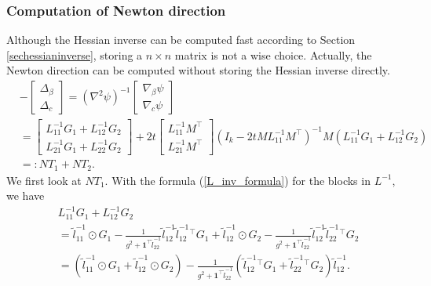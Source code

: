 \documentclass[final,onefignum,onetabnum]{siamart190516}
\begin{document}
\subsubsection{Computation of Newton direction}
Although the Hessian inverse can be computed fast according to Section \ref{sechessianinverse}, storing a $n\times n$ matrix is not a wise choice. Actually, the Newton direction can be computed without storing the Hessian inverse directly.
\begin{equation}
    \begin{aligned}
   &- \begin{bmatrix}
    \Delta_{\beta}\\
    \Delta_c
    \end{bmatrix} = \left(\nabla^{2}\psi\right)^{-1} \begin{bmatrix}
    \nabla_{\beta}\psi\\
    \nabla_{c}\psi
    \end{bmatrix} \\
    &= \begin{bmatrix}
    L^{-1}_{11} G_1 + L^{-1}_{12} G_2 \\
    L^{-1}_{21} G_1 + L^{-1}_{22} G_2
    \end{bmatrix} + 
    2t\begin{bmatrix} L^{-1}_{11}M^\top \\ L^{-1}_{21}M^\top\end{bmatrix}
    (I_k-2t M L^{-1}_{11} M^\top)^{-1}M\left(L^{-1}_{11} G_1 + L^{-1}_{12} G_2\right) \\
    &=: NT_1 + NT_2.
\end{aligned}
\end{equation}
We first look at $NT_1$. With the formula (\ref{L_inv_formula}) for the blocks in $L^{-1}$, we have
\begin{equation}\label{L11-1G1+L12-1G2}
    \begin{aligned}
            &L^{-1}_{11} G_1 + L^{-1}_{12} G_2\\
            &= \widetilde{l}^{-1}_{11} \odot G_1 - \frac{1}{g^2+\mathbf{1}^\top \widetilde{l}^{-1}_{22}}\widetilde{l}^{-1}_{12}\widetilde{l}^{-1}_{12}^\top G_1 + 
            \widetilde{l}^{-1}_{12} \odot G_2 - \frac{1}{g^2+\mathbf{1}^\top \widetilde{l}^{-1}_{22}}\widetilde{l}^{-1}_{12}\widetilde{l}^{-1}_{22}^\top G_2\\
            & = \left(\widetilde{l}^{-1}_{11} \odot G_1 +\widetilde{l}^{-1}_{12} \odot G_2 \right) - \frac{1}{g^2+\mathbf{1}^\top \widetilde{l}^{-1}_{22}}\left(\widetilde{l}^{-1}_{12}^\top G_1 + \widetilde{l}^{-1}_{22}^\top G_2\right)\widetilde{l}^{-1}_{12}.
    \end{aligned}
\end{equation}
\end{document}
